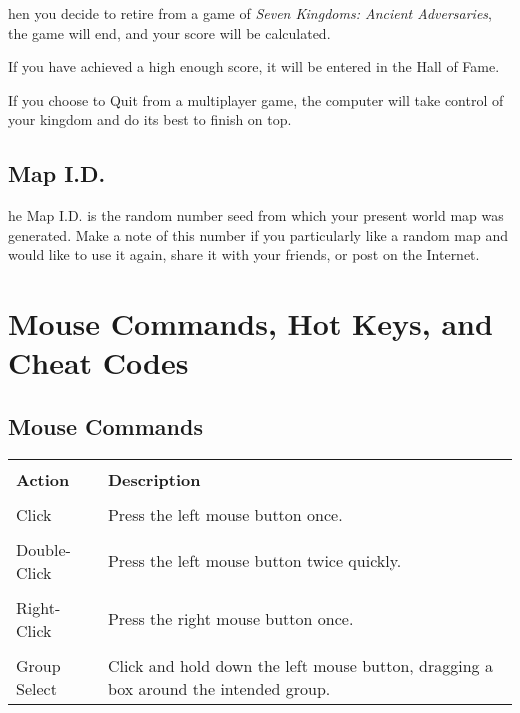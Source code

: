 
hen you decide to retire from a game of \textit{Seven Kingdoms: Ancient Adversaries}, the game will end, and your score will be calculated.

If you have achieved a high enough score, it will be entered in the Hall of Fame.

If you choose to Quit from a multiplayer game, the computer will take control of your kingdom and do its best to finish on top.

\subsection{\textsf{Map I.D.}}



he Map I.D. is the random number seed from which your present world map was generated. Make a note of this number if you particularly like a random map and would like to use it again, share it with your friends, or post on the Internet.

\section{\textsf{Mouse Commands, Hot Keys, and Cheat Codes}}


\subsection{\textsf{Mouse Commands}}



\begin{tabular}{|p{1in} p{3in}|}
    \hline \\
    \textbf{Action} & \textbf{Description} \\ \\
    \hline
    Click & Press the left mouse button once. \\ \\
    Double-Click & Press the left mouse button twice quickly. \\ \\
    Right-Click & Press the right mouse button once. \\ \\
    Group Select & Click and hold down the left mouse button, dragging a box around the intended group. \\
    \hline
\end{tabular}    
    
